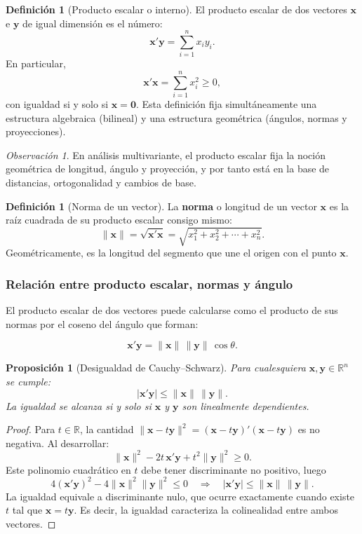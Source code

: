 \documentclass[12pt, a4paper]{article}
\theoremstyle{plain}
\newtheorem{proposicion}[teorema]{Proposición}
\theoremstyle{definition}
\newtheorem{definicion}[teorema]{Definición}
\theoremstyle{remark}
\newtheorem*{observacion}{Observación}
\newcommand{\R}{\mathbb{R}}
\begin{document}
\begin{definicion}[Producto escalar o interno]
El producto escalar de dos vectores $\mathbf{x}$ e $\mathbf{y}$ de igual
dimensión es el número:
\[
  \mathbf{x}'\mathbf{y} = \sum_{i=1}^n x_i y_i.
\]
En particular,
\[
  \mathbf{x}'\mathbf{x}=\sum_{i=1}^n x_i^2\ge 0,
\]
con igualdad si y solo si $\mathbf{x}=\mathbf{0}$.
Esta definición fija simultáneamente una estructura algebraica (bilineal) y una
estructura geométrica (ángulos, normas y proyecciones).
\end{definicion}

\begin{observacion}
En análisis multivariante, el producto escalar fija la noción geométrica de
longitud, ángulo y proyección, y por tanto está en la base de distancias,
ortogonalidad y cambios de base.
\end{observacion}

\begin{definicion}[Norma de un vector]
La \textbf{norma} o longitud de un vector $\mathbf{x}$ es la raíz cuadrada de
su producto escalar consigo mismo:
\[
  \|\mathbf{x}\| = \sqrt{\mathbf{x}'\mathbf{x}} = \sqrt{x_1^2 + x_2^2 + \cdots + x_n^2}.
\]
Geométricamente, es la longitud del segmento que une el origen con el punto
$\mathbf{x}$.
\end{definicion}

\subsubsection{Relación entre producto escalar, normas y ángulo}

El producto escalar de dos vectores puede calcularse como el producto de sus
normas por el coseno del ángulo que forman:

\begin{mdframed}[style=resultado]
\[
  \mathbf{x}'\mathbf{y} = \|\mathbf{x}\|\,\|\mathbf{y}\|\,\cos\theta.
\]
\end{mdframed}

\begin{proposicion}[Desigualdad de Cauchy--Schwarz]
Para cualesquiera $\mathbf{x},\mathbf{y}\in\R^n$ se cumple:
\[
  |\mathbf{x}'\mathbf{y}| \le \|\mathbf{x}\|\,\|\mathbf{y}\|.
\]
La igualdad se alcanza si y solo si $\mathbf{x}$ y $\mathbf{y}$ son linealmente
dependientes.
\end{proposicion}

\begin{proof}
Para $t\in\R$, la cantidad
$\|\mathbf{x}-t\mathbf{y}\|^2=(\mathbf{x}-t\mathbf{y})'(\mathbf{x}-t\mathbf{y})$
es no negativa. Al desarrollar:
\[
  \|\mathbf{x}\|^2-2t\,\mathbf{x}'\mathbf{y}+t^2\|\mathbf{y}\|^2\ge 0.
\]
Este polinomio cuadrático en $t$ debe tener discriminante no positivo, luego
\[
  4(\mathbf{x}'\mathbf{y})^2-4\|\mathbf{x}\|^2\|\mathbf{y}\|^2\le 0
  \quad\Longrightarrow\quad
  |\mathbf{x}'\mathbf{y}| \le \|\mathbf{x}\|\,\|\mathbf{y}\|.
\]
La igualdad equivale a discriminante nulo, que ocurre exactamente cuando existe
$t$ tal que $\mathbf{x}=t\mathbf{y}$. Es decir, la igualdad caracteriza la
colinealidad entre ambos vectores.
\end{proof}
\end{document}
